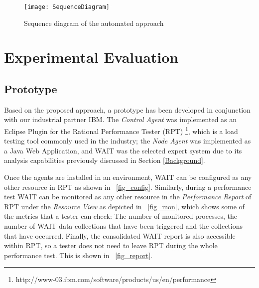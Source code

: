 \documentclass[runningheads,a4paper]{llncs}
\begin{document}
\begin{figure}[!h]
\centering
\texttt{[image: SequenceDiagram]}
\caption{Sequence diagram of the automated approach}
\label{fig_SeqDiagram}
\end{figure}

\vspace{-7pt}
\section{Experimental Evaluation}
\label{ExperimentalEvaluation}


\vspace{-7pt}
\subsection{Prototype}
\vspace{-7pt}
Based on the proposed approach, a prototype has been developed
in conjunction with our industrial partner IBM. The \emph{Control Agent} was
implemented as an Eclipse Plugin for the Rational Performance Tester (RPT)
\footnote{http://www-03.ibm.com/software/products/us/en/performance}, which is a
load testing tool commonly used in the industry; the \emph{Node Agent} was
implemented as a Java Web Application, and WAIT was the selected expert system
due to its analysis capabilities previously discussed in
Section \ref{Background}.

Once the agents are installed in an environment, WAIT can be configured as
any other resource in RPT as shown in \figurename ~\ref{fig_config}. Similarly,
during a performance test WAIT can be monitored as any other resource in the
\emph{Performance Report} of RPT under the \emph{Resource View} as depicted in
\figurename ~\ref{fig_mon}, which shows some of the metrics that a tester can
check: The number of monitored processes, the number of WAIT data collections
that have been triggered and the collections that have occurred. Finally, the
consolidated WAIT report is also accessible within RPT, so a tester does not
need to leave RPT during the whole performance test. This is shown in
\figurename ~\ref{fig_report}. 
\end{document}
